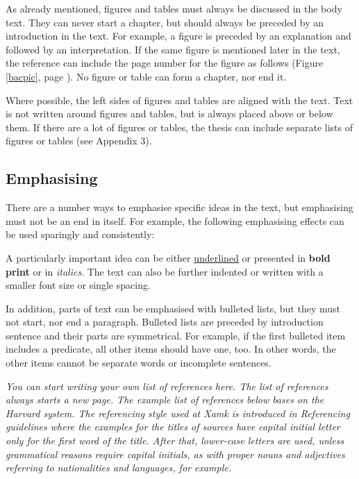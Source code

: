 \documentclass[12pt]{article}
\begin{document}
As already mentioned, figures and tables must always be discussed in the body text. They can never start a chapter, but should always be preceded by an introduction in the text. For example, a figure is preceded by an explanation and followed by an interpretation. If the same figure is mentioned later in the text, the reference can include the page number for the figure as follows (Figure \ref{bacpic}, page \pageref{bacpic}). No figure or table can form a chapter, nor end it.

Where possible, the left sides of figures and tables are aligned with the text. Text is not written around figures and tables, but is always placed above or below them. If there are a lot of figures or tables, the thesis can include separate lists of figures or tables (see Appendix 3).

\subsection{Emphasising}

There are a number ways to emphasise specific ideas in the text, but emphasising must not be an end in itself. For example, the following emphasising effects can be used sparingly and consistently:

{\small A particularly important idea can be either \underline{underlined} or presented in \textbf{bold print} or in \textit{italics}. The text can also be further indented or written with a smaller font size or single spacing.}

In addition, parts of text can be emphasised with bulleted lists, but they must not start, nor end a paragraph. Bulleted lists are preceded by introduction sentence and their parts are symmetrical. For example, if the first bulleted item includes a predicate, all other items should have one, too. In other words, the other items cannot be separate words or incomplete sentences.

\textit{You can start writing your own list of references here. The list of references always starts a new page. The example list of references below bases on the Harvard system. The referencing style used at Xamk is introduced in Referencing guidelines where the examples for the titles of sources have capital initial letter only for the first word of the title. After that, lower-case letters are used, unless grammatical reasons require capital initials, as with proper nouns and adjectives referring to nationalities and languages, for example.}
\end{document}
